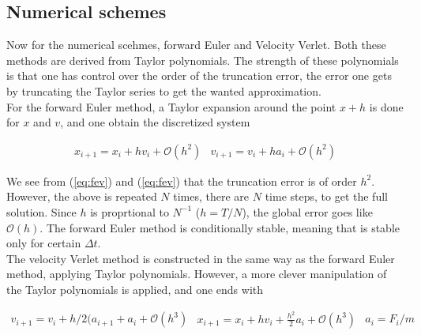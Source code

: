 \documentclass{article}
\begin{document}
\subsection{Numerical schemes}
Now for the numerical scehmes, forward Euler and Velocity Verlet. Both these methods are derived from Taylor polynomials. The strength of these polynomials is that one has control over the order of the truncation error, the error one gets by truncating the Taylor series to get the wanted approximation. \\

For the forward Euler method, a Taylor expansion around the point $x + h$ is done for $x$ and $v$, and one obtain the discretized system

\begin{subequations}
	\begin{align}
		x_{i+1} = x_i + hv_i + \mathcal{O}(h^2)\label{eq:fev}
	\end{align}
	
	\begin{align}
		v_{i+1} = v_i + ha_i + \mathcal{O}(h^2)\label{eq:fea}
	\end{align}
\end{subequations}

We see from (\ref{eq:fev}) and (\ref{eq:fev}) that the truncation error is of order $h^2$. However, the above is repeated $N$ times, there are $N$ time steps, to get the full solution. Since $h$ is proprtional to $N^{-1}$ ($h = T/N$), the global error goes like $\mathcal{O}(h)$. The forward Euler method is conditionally stable, meaning that is stable only for certain $\Delta t$.\\

The velocity Verlet method is constructed in the same way as the forward Euler method, applying Taylor polynomials. However, a more clever manipulation of the Taylor polynomials is applied, and one ends with

\begin{subequations}
	\begin{align}
	v_{i+1} = v_i + h/2(a_{i+1} + a_i + \mathcal{O}(h^3)\label{eq:vvv}
	\end{align}
	
	\begin{align}
	x_{i+1} = x_i + hv_i + \frac{h^2}{2} a_i + \mathcal{O}(h^3)\label{eq:vvx}
	\end{align}
	
	\begin{align}
	a_i = F_i/m\label{eq:vva}
	\end{align}
\end{subequations}
\end{document}

